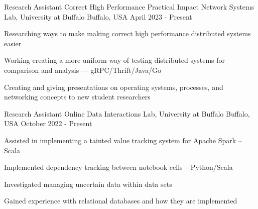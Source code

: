 

\begin{cventries}


  \cventry
    {Research Assistant } %
    {Correct High Performance Practical Impact Network Systems Lab, University at Buffalo } %
    {Buffalo, USA} %
    {April 2023 - Present} %
    {
      \begin{cvitems} %
	\item Researching ways to make making correct high performance distributed systems easier
        \item Working creating a more uniform way of testing distributed systems for comparison and analysis --- gRPC/Thrift/Java/Go
	\item Creating and giving presentations on operating systems, processes, and networking concepts to new student researchers
      \end{cvitems}
    }


  \cventry
    {Research Assistant} %
    {Online Data Interactions Lab, University at Buffalo} %
    {Buffalo, USA} %
    {October 2022 - Present} %
    {
      \begin{cvitems} %
        \item Assisted in implementing a tainted value tracking system for Apache Spark -- Scala
	\item Implemented dependency tracking between notebook cells -- Python/Scala
        \item Investigated managing uncertain data within data sets
        \item Gained experience with relational databases and how they are implemented 
      \end{cvitems}
    }



\end{cventries}
